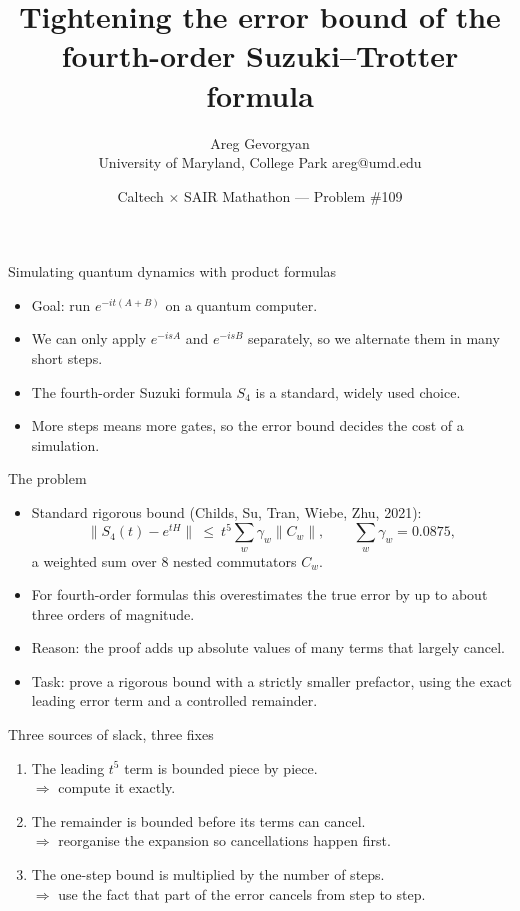\documentclass[11pt,aspectratio=169]{beamer}
\title{Tightening the error bound of the\\fourth-order Suzuki--Trotter formula}
\author{Areg Gevorgyan\\{\small University of Maryland, College Park \quad areg@umd.edu}}
\date{Caltech $\times$ SAIR Mathathon --- Problem \#109}
\newcommand{\norm}[1]{\lVert #1\rVert}
\begin{document}
\begin{frame}
\titlepage
\end{frame}

\begin{frame}{Simulating quantum dynamics with product formulas}
\begin{itemize}[<+->]
\item Goal: run $e^{-it(A+B)}$ on a quantum computer.
\item We can only apply $e^{-isA}$ and $e^{-isB}$ separately, so we alternate them in many short steps.
\item The fourth-order Suzuki formula $S_4$ is a standard, widely used choice.
\item More steps means more gates, so the error bound decides the cost of a simulation.
\end{itemize}
\end{frame}

\begin{frame}{The problem}
\begin{itemize}[<+->]
\item Standard rigorous bound (Childs, Su, Tran, Wiebe, Zhu, 2021):
 \[\norm{S_4(t)-e^{tH}}\ \le\ t^5\sum_w\gamma_w\norm{C_w},\qquad \textstyle\sum_w\gamma_w=0.0875,\]
 a weighted sum over 8 nested commutators $C_w$.
\item For fourth-order formulas this overestimates the true error by up to about three orders of magnitude.
\item Reason: the proof adds up absolute values of many terms that largely cancel.
\item Task: prove a rigorous bound with a strictly smaller prefactor, using the exact leading error term and a controlled remainder.
\end{itemize}
\end{frame}

\begin{frame}{Three sources of slack, three fixes}
\begin{enumerate}[<+->]
\item The leading $t^5$ term is bounded piece by piece.\\
 \quad $\Rightarrow$ compute it exactly.
\item The remainder is bounded before its terms can cancel.\\
 \quad $\Rightarrow$ reorganise the expansion so cancellations happen first.
\item The one-step bound is multiplied by the number of steps.\\
 \quad $\Rightarrow$ use the fact that part of the error cancels from step to step.
\end{enumerate}
\end{frame}
\end{document}
